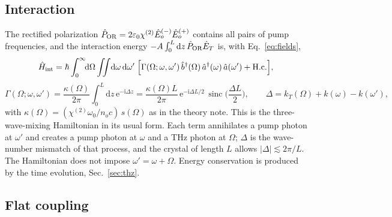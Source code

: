 \documentclass[aps,pra,onecolumn,notitlepage,11pt,amsmath,amssymb,nofootinbib]{revtex4-2}
\newcommand{\dd}{\mathrm{d}}
\newcommand{\ee}{\mathrm{e}}
\newcommand{\ii}{\mathrm{i}}
\newcommand{\sinc}{\operatorname{sinc}}
\begin{document}
\subsection{Interaction}

The rectified polarization
$\hat P_{\rm OR}=2\varepsilon_0\chi^{(2)}\hat E_o^{(-)}\hat E_o^{(+)}$ contains
all pairs of pump frequencies, and the interaction energy
$-A\int_0^L\dd z\,\hat P_{\rm OR}\hat E_T$ is, with Eq.~\eqref{eq:fields},
\begin{equation}
\hat H_{\rm int}=\hbar\int_0^\infty\!\!\dd\Omega\iint\!\dd\omega\,\dd\omega'\;
\Big[\Gamma(\Omega;\omega,\omega')\,\hat b^\dagger(\Omega)\,\hat a^\dagger(\omega)\,\hat a(\omega')
+\mathrm{H.c.}\Big],
\label{eq:Hgen}
\end{equation}
\begin{equation}
\Gamma(\Omega;\omega,\omega')=\frac{\kappa(\Omega)}{2\pi}\int_0^L\!\!\dd z\,\ee^{-\ii\Delta z}
=\frac{\kappa(\Omega)L}{2\pi}\,\ee^{-\ii\Delta L/2}\,\sinc\!\Big(\frac{\Delta L}{2}\Big),
\qquad \Delta=k_T(\Omega)+k(\omega)-k(\omega'),
\label{eq:Gamma}
\end{equation}
with $\kappa(\Omega)=(\chi^{(2)}\omega_0/n_oc)\,s(\Omega)$ as in the theory note.
This is the three-wave-mixing Hamiltonian in its usual form. Each term
annihilates a pump photon at $\omega'$ and creates a pump photon at $\omega$
and a THz photon at $\Omega$; $\Delta$ is the wave-number mismatch of that
process, and the crystal of length $L$ allows $|\Delta|\lesssim2\pi/L$. The
Hamiltonian does not impose $\omega'=\omega+\Omega$. Energy conservation is
produced by the time evolution, Sec.~\ref{sec:thz}.

\subsection{Flat coupling}
\end{document}
